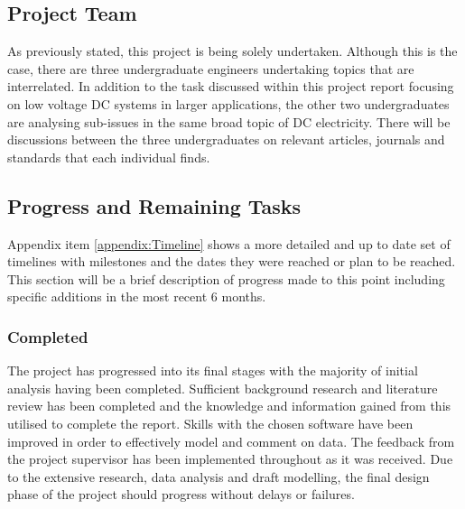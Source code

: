 
\subsection{Project Team}

As previously stated, this project is being solely undertaken. Although this is the case, there are three undergraduate engineers undertaking topics that are interrelated. In addition to the task discussed within this project report focusing on low voltage DC systems in larger applications, the other two undergraduates are analysing sub-issues in the same broad topic of DC electricity. There will be discussions between the three undergraduates on relevant articles, journals and standards that each individual finds.



\subsection{Progress and Remaining Tasks}

Appendix item \ref{appendix:Timeline} shows a more detailed and up to date set of timelines with milestones and the dates they were reached or plan to be reached. This section will be a brief description of progress made to this point including specific additions in the most recent 6 months. 

\subsubsection{Completed}

The project has progressed into its final stages with the majority of initial analysis having been completed. Sufficient background research and literature review has been completed and the knowledge and information gained from this utilised to complete the report. Skills with the chosen software have been improved in order to effectively model and comment on data. The feedback from the project supervisor has been implemented throughout as it was received. Due to the extensive research, data analysis and draft modelling, the final design phase of the project should progress without delays or failures. 

